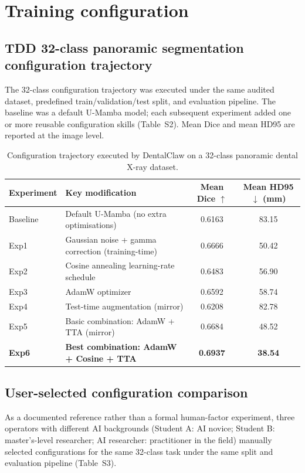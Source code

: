 \documentclass[11pt]{article}
\begin{document}
\section{Training configuration}

\subsection{TDD 32-class panoramic segmentation configuration trajectory}

The 32-class configuration trajectory was executed under the same audited dataset, predefined train/validation/test split, and evaluation pipeline. The baseline was a default U-Mamba model; each subsequent experiment added one or more reusable configuration skills (Table~S2). Mean Dice and mean HD95 are reported at the image level.

\begin{table}[!ht]
\centering
\small
\caption{Configuration trajectory executed by DentalClaw on a 32-class panoramic dental X-ray dataset.}
\label{tab:supp_tdd_trajectory}
\begin{tabular}{l l c c}
\toprule
Experiment & Key modification & Mean Dice $\uparrow$ & Mean HD95 $\downarrow$ (mm) \\
\midrule
Baseline & Default U-Mamba (no extra optimisations) & 0.6163 & 83.15 \\
Exp1 & Gaussian noise + gamma correction (training-time) & 0.6666 & 50.42 \\
Exp2 & Cosine annealing learning-rate schedule & 0.6483 & 56.90 \\
Exp3 & AdamW optimizer & 0.6592 & 58.74 \\
Exp4 & Test-time augmentation (mirror) & 0.6208 & 82.78 \\
Exp5 & Basic combination: AdamW + TTA (mirror) & 0.6684 & 48.52 \\
\textbf{Exp6} & \textbf{Best combination: AdamW + Cosine + TTA} & \textbf{0.6937} & \textbf{38.54} \\
\bottomrule
\end{tabular}
\end{table}

\subsection{User-selected configuration comparison}

As a documented reference rather than a formal human-factor experiment, three operators with different AI backgrounds (Student A: AI novice; Student B: master's-level researcher; AI researcher: practitioner in the field) manually selected configurations for the same 32-class task under the same split and evaluation pipeline (Table~S3).
\end{document}
